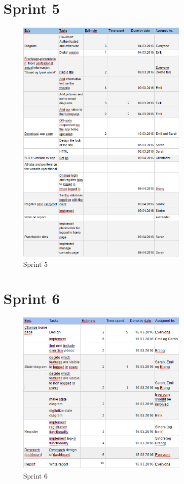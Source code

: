 \section{Sprint 5}\label{sprint5}

\begin{figure}[H]
\centering
\includegraphics[width = 0.75\textwidth]{Figures/sprints/sprint5}
\caption{Sprint 5}
    \label{fig:SP5}
    \end{figure}

\section{Sprint 6}\label{sprint6}

\begin{figure}[H]
\centering
\includegraphics[width = 0.75\textwidth]{Figures/sprints/sprint6}
\caption{Sprint 6}
    \label{fig:SP6}
    \end{figure}

